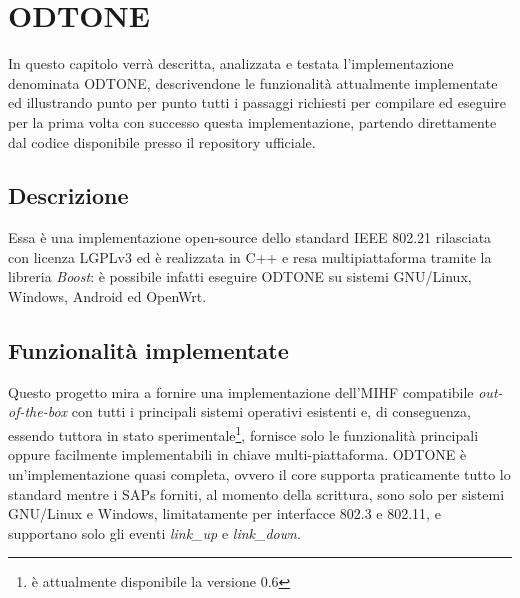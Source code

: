 \chapter{ODTONE}

In questo capitolo verrà descritta, analizzata e testata l'implementazione denominata ODTONE\cite{odtone}, descrivendone le funzionalità attualmente implementate ed illustrando punto per punto tutti i passaggi richiesti per compilare ed eseguire per la prima volta con successo questa implementazione, partendo direttamente dal codice disponibile presso il repository ufficiale.

\section{Descrizione}
Essa è una implementazione open-source dello standard IEEE 802.21 rilasciata con licenza LGPLv3\cite{lgpl} ed è realizzata in C++ e resa multipiattaforma tramite la libreria {\em Boost}\cite{boost}: è possibile infatti eseguire ODTONE su sistemi GNU/Linux, Windows, Android ed OpenWrt.\cite{getstart}

\section{Funzionalità implementate}

Questo progetto mira a fornire una implementazione dell'MIHF compatibile {\em out-of-the-box} con tutti i principali sistemi operativi esistenti e, di conseguenza, essendo tuttora in stato sperimentale\footnote{è attualmente disponibile la versione 0.6}, fornisce solo le funzionalità principali oppure facilmente implementabili in chiave multi-piattaforma. ODTONE è un'implementazione quasi completa, ovvero il core supporta praticamente tutto lo standard mentre i SAPs forniti, al momento della scrittura, sono solo per sistemi GNU/Linux e Windows, limitatamente per interfacce 802.3 e 802.11, e supportano solo gli eventi {\em link\_up} e {\em link\_down}.

